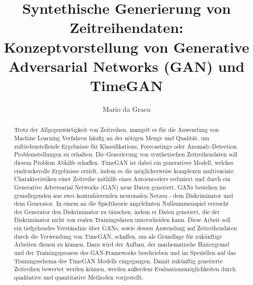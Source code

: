 \documentclass[runningheads]{llncs}
\begin{document}
%
\title{Syntethische Generierung von Zeitreihendaten: Konzeptvorstellung von Generative Adversarial Networks (GAN) und TimeGAN}
%
%
\author{Mario da Graca}
%
%
%
\maketitle              %
%
\begin{abstract}
Trotz der Allgegenwärtigkeit von Zeitreihen, mangelt es für die Anwendung von Machine Learning Verfahren häufig an der nötigen Menge und Qualität, um zufriedenstellende Ergebnisse für Klassifikations, Forecastings oder Anomaly-Detection Problemstellungen zu erhalten. Die Generierung von synthetischen Zeitreihendaten soll diesem Problem Abhilfe schaffen. TimeGAN ist dabei ein generatives Modell, welches eindrucksvolle Ergebnisse erzielt, indem es die möglicherweise komplexen multivariate Charakteristiken einer Zeitreihe mithilfe eines Autoencoders reduziert und durch ein Generative Adversarial Networks (GAN) neue Daten generiert. GANs bestehen im grundlegenden aus zwei kontrahierenden neuronalen Netzen - dem Diskriminator und dem Generator. In einem an die Spieltheorie angelehnten Nullsummenspiel versucht der Generator den Diskriminator zu täuschen, indem er Daten generiert, die der Diskriminator nicht von realen Trainingsdaten unterscheiden kann.
Diese Arbeit soll ein tiefgehendes Verständnis über GANs, sowie dessen Anwendung auf Zeitreihendaten durch die Verwendung von TimeGAN, schaffen, um als Grundlage für zukünftige Arbeiten dienen zu können. Dazu wird der Aufbau, der mathematische Hintergrund und der Trainingsprozess des GAN-Frameworks beschrieben und im Speziellen auf das Trainingsschema des TimeGAN Modells eingegangen. Damit zukünftig generierte Zeitreihen bewertet werden können, werden außerdem Evaluationsmöglichkeiten durch qualitative und quantitative Methoden vorgestellt.

\end{abstract}
%
%
%




%
%
%
% 
% 
%
\printbibliography
%
\end{document}
